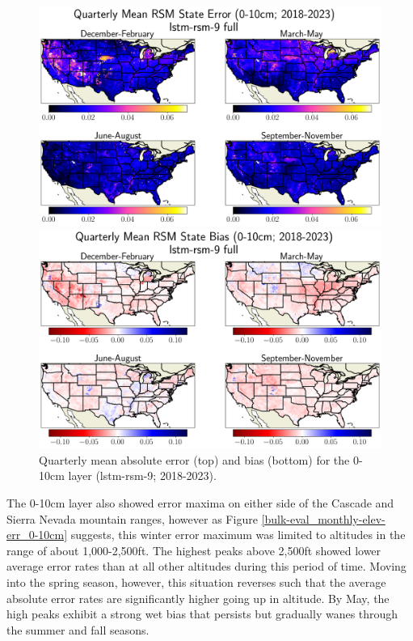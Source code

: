 \begin{figure}[hp!]
    \centering

    \includegraphics[width=.99\linewidth,draft=false]{figures/grid-eval_qtrly/eval-grid_full_lstm-rsm-9_pixelwise-time-stats_abs-err_qtrly-err-state-rsm-10.png}


    \includegraphics[width=.99\linewidth,draft=false]{figures/grid-eval_qtrly/eval-grid_full_lstm-rsm-9_pixelwise-time-stats_bias_qtrly-err-state-rsm-10.png}

    \caption{Quarterly mean absolute error (top) and bias (bottom) for the 0-10cm layer (lstm-rsm-9; 2018-2023).}
    \label{bulk-eval_qtrly_rsm-10}
\end{figure}

The 0-10cm layer also showed error maxima on either side of the Cascade and Sierra Nevada mountain ranges, however as Figure \ref{bulk-eval_monthly-elev-err_0-10cm} suggests, this winter error maximum was limited to altitudes in the range of about 1,000-2,500ft. The highest peaks above 2,500ft showed lower average error rates than at all other altitudes during this period of time. Moving into the spring season, however, this situation reverses such that the average absolute error rates are significantly higher going up in altitude. By May, the high peaks exhibit a strong wet bias that persists but gradually wanes through the summer and fall seasons.

